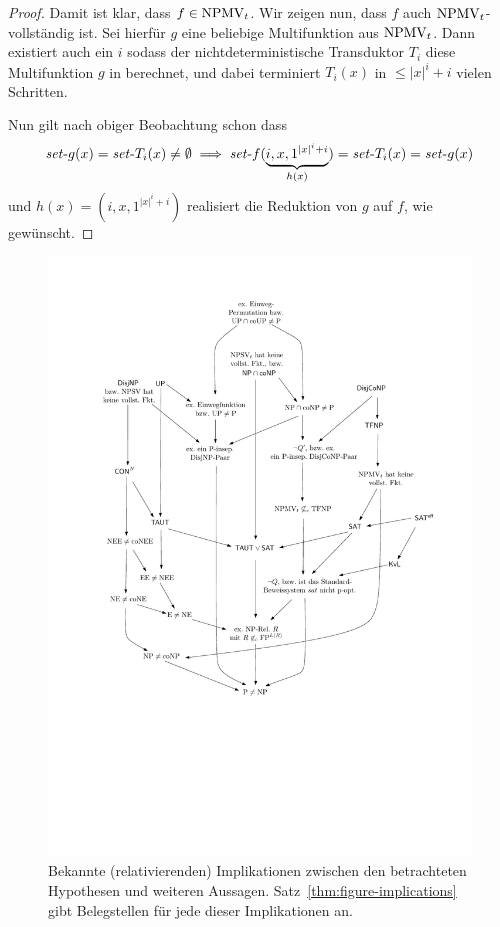\begin{proof}
    Damit ist klar, dass $f\in\mathrm{NPMV}_t$.
    Wir zeigen nun, dass $f$ auch $\mathrm{NPMV}_t$-vollständig ist.
    Sei hierfür $g$ eine beliebige Multifunktion aus $\mathrm{NPMV}_t$.
    Dann existiert auch ein $i$ sodass der  nichtdeterministische Transduktor $T_i$ diese Multifunktion $g$ in berechnet, und dabei terminiert $T_i(x)$ in $\leq |x|^i+i$ vielen Schritten.

    Nun gilt nach obiger Beobachtung schon dass 
    \[ \mathit{set}\text{-}{g}(x) = \mathit{set}\text{-}{T_i}(x)\neq\emptyset \implies \mathit{set}\text{-}{f}(\underbrace{i, x, 1^{|x|^i+i}}_{h(x)})=\mathit{set}\text{-}{T_i}(x)=\mathit{set}\text{-}{g}(x) \]
    und $h(x)=(i, x, 1^{|x|^i+i})$ realisiert die Reduktion von $g$ auf $f$, wie gewünscht.
\end{proof}




\begin{figure}
    \hspace*{-12mm}\includegraphics[page=1]{figures.pdf}
    \caption{Bekannte (relativierenden) Implikationen zwischen den betrachteten Hypothesen und weiteren Aussagen. Satz~\ref{thm:figure-implications} gibt Belegstellen für jede dieser Implikationen an.}\label{fig:figure-implications}
\end{figure}

